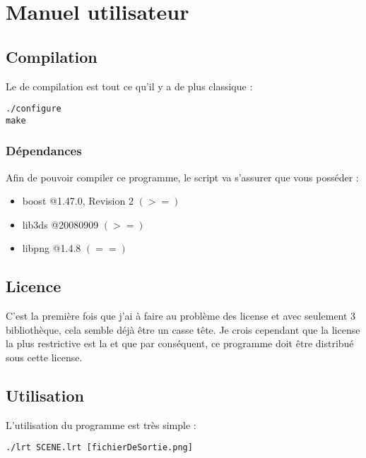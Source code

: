 \chapter{Manuel utilisateur}
\section{Compilation}
Le  de compilation est tout ce qu'il y a de plus classique :
\begin{center}
\begin{verbatim}
./configure
make
\end{verbatim}
\end{center}

\subsection{Dépendances}
Afin de pouvoir compiler ce programme, le script  va s'assurer
que vous posséder :
\begin{itemize}
  \item boost @1.47.0, Revision 2 $(>=)$
  \item lib3ds @20080909 $(>=)$
  \item libpng @1.4.8 $(==)$
\end{itemize}

\section{Licence}
C'est la première fois que j'ai à faire au problème des license et avec
seulement 3 bibliothèque, cela semble déjà être un casse tête. Je crois
cependant que la license la plus restrictive est la  et que par conséquent, ce programme doit être distribué sous cette
license.

\section{Utilisation}
L'utilisation du programme est très simple :
\begin{center}
\begin{verbatim}
./lrt SCENE.lrt [fichierDeSortie.png]
\end{verbatim}
\end{center}


